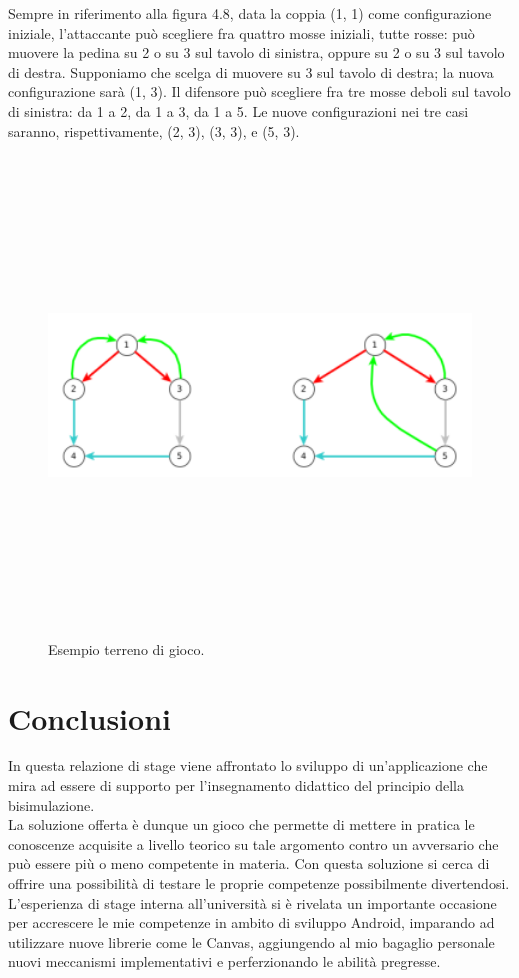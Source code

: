 \documentclass[a4paper,11pt,twoside,openright]{report}
\begin{document}
Sempre in riferimento alla figura 4.8, data la coppia (1, 1) come configurazione iniziale, l’attaccante può scegliere fra quattro mosse iniziali, tutte rosse: può muovere la pedina su 2 o su 3 sul tavolo di sinistra, oppure su 2 o su 3 sul tavolo di destra. Supponiamo che scelga di muovere su 3 sul tavolo di destra; la nuova configurazione
sarà (1, 3). Il difensore può scegliere fra tre mosse deboli sul tavolo di sinistra: da 1 a 2, da 1 a 3, da 1 a 5. Le nuove configurazioni nei tre casi saranno, rispettivamente,
(2, 3), (3, 3), e (5, 3).

\begin{figure}[h]
\centering
\includegraphics[width=\linewidth,height=360pt,keepaspectratio]{images/Rules.png}
\caption{Esempio terreno di gioco.}
\end{figure}

\chapter{Conclusioni}
In questa relazione di stage viene affrontato lo sviluppo di un'applicazione che mira ad essere di supporto per l'insegnamento didattico del principio della bisimulazione.\\
La soluzione offerta è dunque un gioco che permette di mettere in pratica le conoscenze acquisite a livello teorico su tale argomento contro un avversario che può essere più o meno competente in materia. Con questa soluzione si cerca di offrire una possibilità di testare le proprie competenze possibilmente divertendosi.\\
L'esperienza di stage interna all'università si è rivelata un importante occasione per accrescere le mie competenze in ambito di sviluppo Android, imparando ad utilizzare nuove librerie come le Canvas, aggiungendo al mio bagaglio personale nuovi meccanismi implementativi e perferzionando le abilità pregresse.
\end{document}
